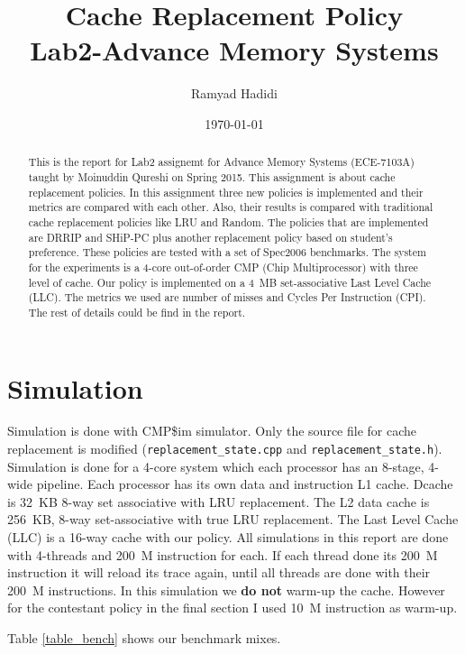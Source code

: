 \documentclass{article}
\title{Cache Replacement Policy \\
        \large{Lab2-Advance Memory Systems}}
\author{Ramyad Hadidi}
\date{\today}
\begin{document}
\maketitle

\begin{abstract}
This is the report for Lab2 assignemt for Advance Memory Systems (ECE-7103A) taught by Moinuddin Qureshi on Spring 2015. This assignment is about cache replacement policies. In this assignment three new policies is implemented and their metrics are compared with each other. Also, their results is compared with traditional cache replacement policies like LRU and Random. The policies that are implemented are DRRIP\cite{rrip} and SHiP-PC\cite{ship} plus another replacement policy based on student's preference. These policies are tested with a set of Spec2006 benchmarks. The system for the experiments is a 4-core out-of-order CMP (Chip Multiprocessor) with three level of cache. Our policy is implemented on a 4~MB set-associative Last Level Cache (LLC). The metrics we used are number of misses and Cycles Per Instruction (CPI). The rest of details could be find in the report.
\end{abstract}

\section{Simulation}
Simulation is done with CMP\$im \cite{sim} simulator. Only the source file for cache replacement is modified (\verb+replacement_state.cpp+ and \verb+replacement_state.h+). Simulation is done for a 4-core system which each processor has an 8-stage, 4-wide pipeline. Each processor has its own data and instruction L1 cache. Dcache is 32~KB 8-way set associative with LRU replacement. The L2 data cache is 256~KB, 8-way set-associative with true LRU replacement. The Last Level Cache (LLC) is a 16-way cache with our policy. All simulations in this report are done with 4-threads and 200~M instruction for each. If each thread done its 200~M instruction it will reload its trace again, until all threads are done with their 200~M instructions. In this simulation we \textbf{do not} warm-up the cache. However for the contestant policy in the final section I used 10~M instruction as warm-up.

Table \ref{table_bench} shows our benchmark mixes.
\end{document}

